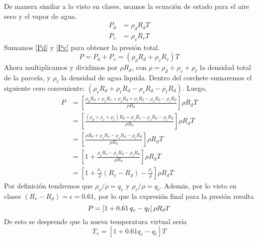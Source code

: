 \documentclass[class=article, crop=true]{standalone}
\begin{document}
De manera similar a lo visto en clases, usamos la ecuación de estado para el aire seco y el vapor de agua.
\begin{align}
    P_d &= \rho_d R_d T \label{Pd} \\ 
    P_v &= \rho_v R_v T \label{Pv}
\end{align}
Sumamos \eqref{Pd} y \eqref{Pv} para obtener la presión total.
$$    P = P_d + P_v = (\rho_d R_d + \rho_v R_v) T $$
Ahora multiplicamos y dividimos por $\rho R_d$, con $\rho = \rho_d + \rho_v + \rho_\ell$ la densidad total de la parcela, y $\rho_\ell$ la densidad de agua liquida.
Dentro del corchete sumaremos el siguiente cero conveniente: $(\rho_v R_d + \rho_\ell R_d - \rho_v R_d - \rho_\ell R_d)$. Luego, 
\begin{align*}
    P &= \left[ \frac{\rho_d R_d + \rho_v R_v + \rho_v R_d + \rho_\ell R_d - \rho_v R_d - \rho_\ell R_d }{\rho R_d} \right]\rho R_d T\\
    &=  \left[ \frac{(\rho_d + \rho_v + \rho_\ell) R_d +  \rho_v R_v - \rho_v R_d - \rho_\ell R_d }{\rho R_d} \right]\rho R_d T\\
    &=  \left[ \frac{\rho R_d +  \rho_v R_v - \rho_v R_d - \rho_\ell R_d }{\rho R_d} \right]\rho R_d T\\
    &=  \left[ 1 + \frac{ \rho_v R_v - \rho_v R_d - \rho_\ell R_d }{\rho R_d} \right]\rho R_d T\\
    &=  \left[ 1 + \frac{ \rho_v }{\rho }(R_v - R_d) - \frac{\rho_\ell}{\rho} \right]\rho R_d T
\end{align*}
Por definición tendremos que $\rho_v/\rho = q_v$ y $\rho_\ell/\rho = q_\ell$. Además, por lo visto en clases $(R_v - R_d) = \epsilon = 0.61$, por lo que la expresión final para la presión resulta
\begin{equation}
    P=  \left[ 1 + 0.61\, q_v - q_\ell \right]\rho R_d T\\
\end{equation}
De esto se desprende que la nueva temperatura virtual sería
\begin{equation}
    T_v = [1 + 0.61 q_v - q_\ell]T
\end{equation}
\end{document}
